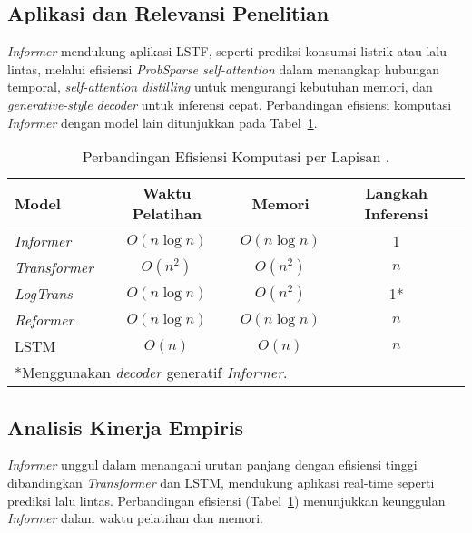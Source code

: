 \subsection{Aplikasi dan Relevansi Penelitian}
\label{sec:informer_application}

\textit{Informer} mendukung aplikasi LSTF, seperti prediksi konsumsi listrik atau lalu lintas, melalui efisiensi \textit{ProbSparse self-attention} dalam menangkap hubungan temporal, \textit{self-attention distilling} untuk mengurangi kebutuhan memori, dan \textit{generative-style decoder} untuk inferensi cepat. Perbandingan efisiensi komputasi \textit{Informer} dengan model lain ditunjukkan pada Tabel~\ref{tab:computational_efficiency}.

\begin{table}[H]
    \centering
    \caption{Perbandingan Efisiensi Komputasi per Lapisan \citep{Zhou2021}.}
    \label{tab:computational_efficiency}
    \begin{tabular}{lccc}
        \toprule
        \textbf{Model} & \textbf{Waktu Pelatihan} & \textbf{Memori} & \textbf{Langkah Inferensi} \\
        \midrule
        \textit{Informer} & \( O(n \log n) \) & \( O(n \log n) \) & 1 \\
        \textit{Transformer} & \( O(n^2) \) & \( O(n^2) \) & \( n \) \\
        \textit{LogTrans} & \( O(n \log n) \) & \( O(n^2) \) & 1* \\
        \textit{Reformer} & \( O(n \log n) \) & \( O(n \log n) \) & \( n \) \\
        LSTM & \( O(n) \) & \( O(n) \) & \( n \) \\
        \bottomrule
        \multicolumn{4}{l}{*Menggunakan \textit{decoder} generatif \textit{Informer}.}
    \end{tabular}
\end{table}

\subsection{Analisis Kinerja Empiris}
\label{sec:informer_performance}

\textit{Informer} unggul dalam menangani urutan panjang dengan efisiensi tinggi dibandingkan \textit{Transformer} dan LSTM, mendukung aplikasi real-time seperti prediksi lalu lintas. Perbandingan efisiensi (Tabel~\ref{tab:computational_efficiency}) menunjukkan keunggulan \textit{Informer} dalam waktu pelatihan dan memori.

